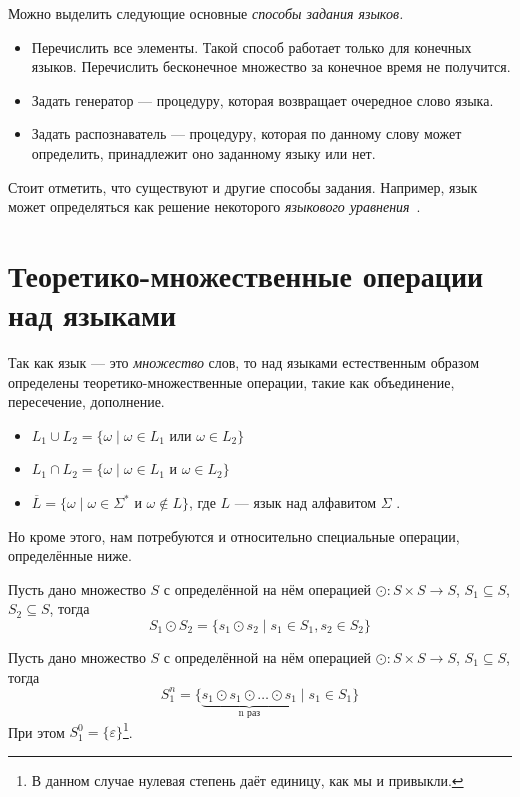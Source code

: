 Можно выделить следующие основные \textit{способы задания языков.}
\begin{itemize}
\item Перечислить все элементы. Такой способ работает только для конечных языков. Перечислить бесконечное множество за конечное время не получится.
\item Задать генератор --- процедуру, которая возвращает очередное слово языка.
\item Задать распознаватель --- процедуру, которая по данному слову может определить, принадлежит оно заданному языку или нет.
\end{itemize}

Стоит отметить, что существуют и другие способы задания.
Например, язык может определяться как решение некоторого \textit{языкового уравнения}~\cite{Leiss1999}.

\section{Теоретико-множественные операции над языками}

Так как язык --- это \textit{множество} слов, то над языками естественным образом определены теоретико-множественные операции, такие как объединение, пересечение, дополнение.
\begin{itemize}
  \item $L_1 \cup L_2 = \{ \omega \mid \omega \in L_1 \text{ или } \omega \in L_2\}$
  \item $L_1 \cap L_2 = \{ \omega \mid \omega \in L_1 \text{ и } \omega \in L_2\}$
  \item $\overline{L} = \{ \omega \mid \omega \in \Sigma^* \text{ и } \omega \notin L\}$, где $L$ --- язык над алфавитом $\Sigma$ .
\end{itemize}

Но кроме этого, нам потребуются и относительно специальные операции, определённые ниже.

\begin{definition}
Пусть дано множество $S$ с определённой на нём операцией $\odot: S \times S \to S$, $S_1 \subseteq S$, $S_2 \subseteq S$, тогда 
$$
S_1 \odot S_2 = \{ s_1 \odot s_2 \mid s_1 \in S_1, s_2 \in S_2\}
$$
\end{definition}

\begin{definition}
Пусть дано множество $S$ с определённой на нём операцией $\odot: S \times S \to S$, $S_1 \subseteq S$, тогда 
$$
S_1 ^ n = \{ \underbrace{s_1 \odot s_1 \odot \ldots \odot s_1}_{\text{n раз}} \mid s_1 \in S_1\}
$$
При этом $S_1^0 = \{\varepsilon\}$\footnote{В данном случае нулевая степень даёт единицу, как мы и привыкли.}.
\end{definition}

